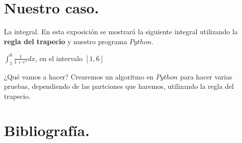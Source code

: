 \documentclass{beamer}
\begin{document}
  \section{Nuestro caso.}
  \begin{frame}
    \begin{block}{La integral.}
      En esta exposición se mostrará la siguiente integral utilizando la \textbf{regla del trapecio} y nuestro programa $Python$.\\
      \begin{center}
	$\int_{1}^{6}\frac{1}{1+e^x}dx$, en el intervalo $[1,6]$
      \end{center}
    \end{block}

    \begin{block}{¿Qué vamos a hacer?}
      Crearemos un algoritmo en \textbf{$Python$} para hacer varias pruebas, dependiendo de las partciones que haremos, utilizando la regla del trapecio.
    \end{block}
  \end{frame}


  \section{Bibliografía.}
  \begin{thebibliography}{00}
    \bibitem{}
    
  \end{thebibliography}

\end{document}
